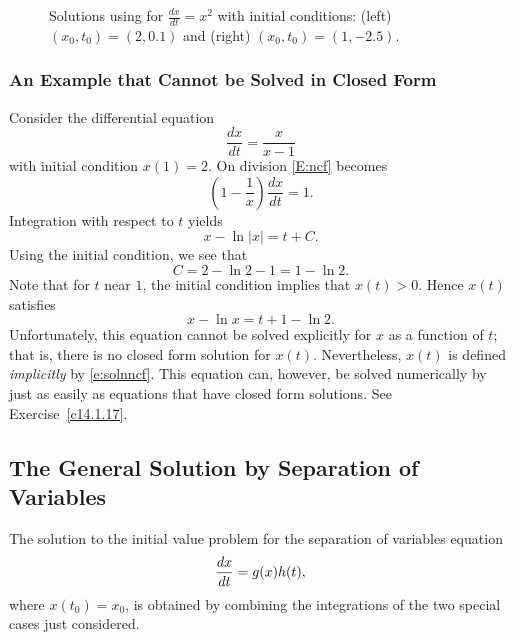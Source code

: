 \documentclass{ximera}
\begin{document}
\begin{figure*}[htb]
           \centerline{%
	   }
           \caption{Solutions using {\dfield} for $\frac{dx}{dt} = x^2$ 
		with initial conditions: (left) $(x_0,t_0)=(2,0.1)$ and 
		(right) $(x_0,t_0)=(1,-2.5)$.}
           \label{F:x^2}
\end{figure*}

\subsubsection*{An Example that Cannot be Solved in Closed Form}

Consider the differential equation
\begin{equation}  \label{E:ncf}
\frac{dx}{dt} = \frac{x}{x-1}
\end{equation}
with initial condition $x(1)=2$. On division \eqref{E:ncf} becomes 
\[
\left(1-\frac{1}{x}\right)\frac{dx}{dt} = 1.
\]
Integration with respect to $t$ yields
\[
x - \ln|x| = t + C.
\]
Using the initial condition, we see that 
\[
C = 2 - \ln 2 -1 = 1 - \ln 2.
\]
Note that for $t$ near $1$, the initial condition implies that $x(t)>0$.  
Hence $x(t)$ satisfies
\begin{equation} \label{e:solnncf}
x -\ln x = t + 1 - \ln 2.
\end{equation}
Unfortunately, this equation cannot be solved explicitly for $x$ 
as a function of $t$; that is, there is no closed form 
solution 
for $x(t)$.  Nevertheless, $x(t)$ is defined 
{\em implicitly\/} 
by \eqref{e:solnncf}.  This equation can, however, be solved numerically by
{\dfield} just as easily as equations that have closed form solutions.
See Exercise~\ref{c14.1.17}. 

\subsection*{The General Solution by Separation of Variables}

The solution to the initial value problem for the separation
of variables equation
\begin{equation}  \label{eq:ghivp}
\displaystyle \frac{dx}{dt} =  g(x) h(t),
\end{equation}
where $x(t_0) = x_0$, is obtained by combining the integrations of the two 
special cases just considered.  
\end{document}
